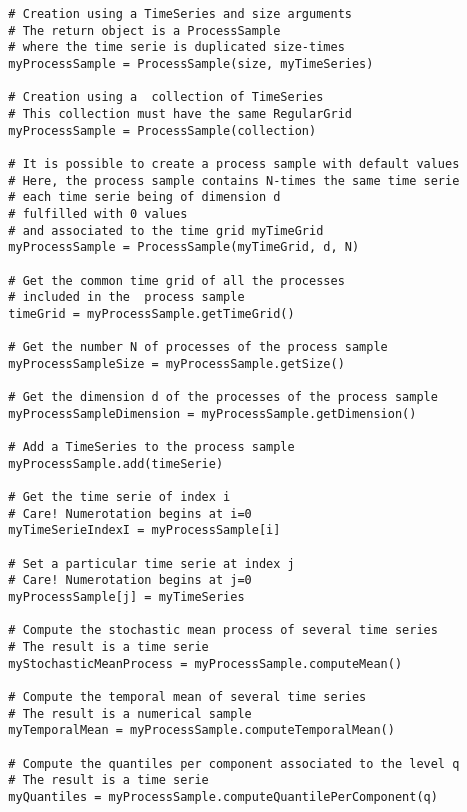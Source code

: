 \begin{lstlisting}
  # Creation using a TimeSeries and size arguments
  # The return object is a ProcessSample
  # where the time serie is duplicated size-times
  myProcessSample = ProcessSample(size, myTimeSeries)

  # Creation using a  collection of TimeSeries
  # This collection must have the same RegularGrid
  myProcessSample = ProcessSample(collection)

  # It is possible to create a process sample with default values
  # Here, the process sample contains N-times the same time serie
  # each time serie being of dimension d
  # fulfilled with 0 values
  # and associated to the time grid myTimeGrid
  myProcessSample = ProcessSample(myTimeGrid, d, N)

  # Get the common time grid of all the processes
  # included in the  process sample
  timeGrid = myProcessSample.getTimeGrid()

  # Get the number N of processes of the process sample
  myProcessSampleSize = myProcessSample.getSize()

  # Get the dimension d of the processes of the process sample
  myProcessSampleDimension = myProcessSample.getDimension()

  # Add a TimeSeries to the process sample
  myProcessSample.add(timeSerie)

  # Get the time serie of index i
  # Care! Numerotation begins at i=0
  myTimeSerieIndexI = myProcessSample[i]

  # Set a particular time serie at index j
  # Care! Numerotation begins at j=0
  myProcessSample[j] = myTimeSeries

  # Compute the stochastic mean process of several time series
  # The result is a time serie
  myStochasticMeanProcess = myProcessSample.computeMean()

  # Compute the temporal mean of several time series
  # The result is a numerical sample
  myTemporalMean = myProcessSample.computeTemporalMean()

  # Compute the quantiles per component associated to the level q
  # The result is a time serie
  myQuantiles = myProcessSample.computeQuantilePerComponent(q)

\end{lstlisting}

